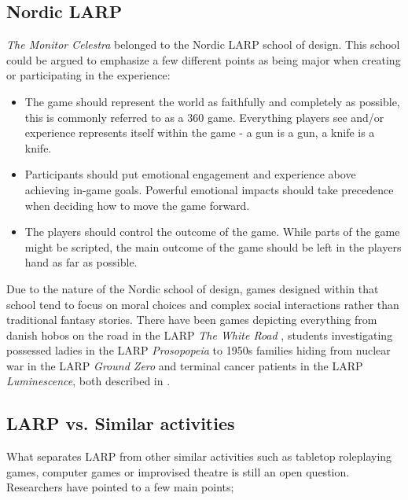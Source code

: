 \subsection{Nordic LARP}

\emph{The Monitor Celestra} belonged to the Nordic LARP school of design. This school could be argued to emphasize a few different points as being major when creating or participating in the experience: 

\begin{itemize}
\item The game should represent the world as faithfully and completely as possible, this is commonly referred to as a 360\degree{} game. Everything players see and/or experience represents itself within the game - a gun is a gun, a knife is a knife.
\item Participants should put emotional engagement and experience above achieving in-game goals. Powerful emotional impacts should take precedence when deciding how to move the game forward.
\item The players should control the outcome of the game. While parts of the game might be scripted, the main outcome of the game should be left in the players hand as far as possible.
\end{itemize}

Due to the nature of the Nordic school of design, games designed within that school tend to focus on moral choices and complex social interactions rather than traditional fantasy stories. There have been games depicting everything from danish hobos on the road in the LARP \emph{The White Road} \cite{pedersen2008}, students investigating possessed ladies in the LARP \emph{Prosopopeia} \cite{jonsson2006prosopopeia, montola2006prosopopeia} to 1950s families hiding from nuclear war in the LARP \emph{Ground Zero} and terminal cancer patients in the LARP \emph{Luminescence}, both described in \cite{nordiclarp}.

\subsection{LARP vs. Similar activities}

What separates LARP from other similar activities such as tabletop
roleplaying games, computer games or improvised theatre is still an
open question. Researchers \cite{montola2012,turku3,henriksen2004}
have pointed to a few main points; 

